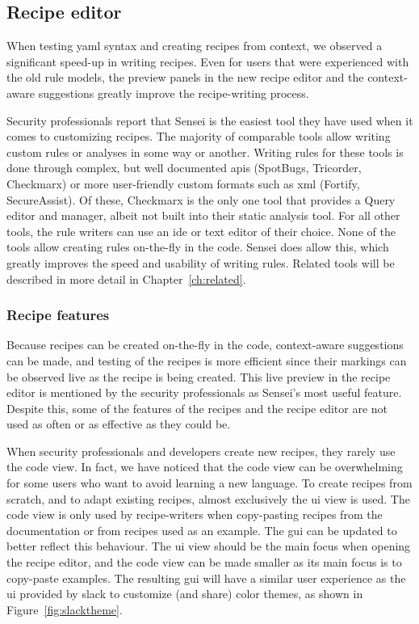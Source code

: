 \subsection{Recipe editor}
When testing \gls{yaml} syntax and creating recipes from context, we observed a significant speed-up in writing recipes.
Even for users that were experienced with the old rule models, the preview panels in the new recipe editor and the context-aware suggestions greatly improve the recipe-writing process.

Security professionals report that Sensei is the easiest tool they have used when it comes to customizing recipes.
The majority of comparable tools allow writing custom rules or analyses in some way or another.
Writing rules for these tools is done through complex, but well documented \glspl{api} (SpotBugs, Tricorder, Checkmarx) or more user-friendly custom formats such as \gls{xml} (Fortify, SecureAssist).
Of these, Checkmarx is the only one tool that provides a Query editor and manager, albeit not built into their static analysis tool.
For all other tools, the rule writers can use an \gls{ide} or text editor of their choice.
None of the tools allow creating rules on-the-fly in the code.
Sensei does allow this, which greatly improves the speed and usability of writing rules.
Related tools will be described in more detail in Chapter~\ref{ch:related}.

\subsubsection{Recipe features}
Because recipes can be created on-the-fly in the code, context-aware suggestions can be made, and testing of the recipes is more efficient since their markings can be observed live as the recipe is being created.
This live preview in the recipe editor is mentioned by the security professionals as Sensei's most useful feature.
Despite this, some of the features of the recipes and the recipe editor are not used as often or as effective as they could be.

When security professionals and developers create new recipes, they rarely use the code view.
In fact, we have noticed that the code view can be overwhelming for some users who want to avoid learning a new language.
To create recipes from scratch, and to adapt existing recipes, almost exclusively the \gls{ui} view is used.
The code view is only used by recipe-writers when copy-pasting recipes from the documentation or from recipes used as an example.
The \gls{gui} can be updated to better reflect this behaviour.
The \gls{ui} view should be the main focus when opening the recipe editor, and the code view can be made smaller as its main focus is to copy-paste examples.
The resulting \gls{gui} will have a similar user experience as the \gls{ui} provided by \gls{slack} to customize (and share) color themes, as shown in Figure~\ref{fig:slacktheme}.

